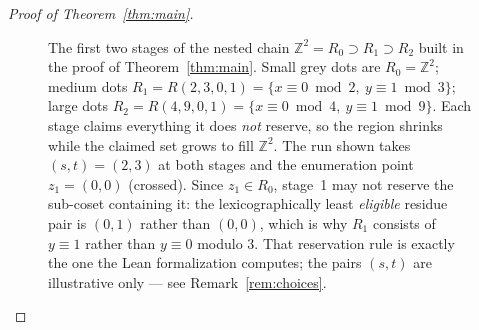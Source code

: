 \documentclass[a4paper,11pt,oneside,reqno]{amsart}
\theoremstyle{definition}
\theoremstyle{remark}
\theoremstyle{plain}
\newcommand{\Z}{\mathbb{Z}}
\begin{document}
\begin{proof}[Proof of Theorem~\ref{thm:main}]
\begin{figure}[htbp]
  \centering
  \caption{The first two stages of the nested chain \(\Z^2=R_0\supset R_1\supset R_2\) built in the
    proof of Theorem~\ref{thm:main}. Small grey dots are \(R_0=\Z^2\); medium dots
    \(R_1=R(2,3,0,1)=\{x\equiv0\bmod2,\ y\equiv1\bmod3\}\); large dots
    \(R_2=R(4,9,0,1)=\{x\equiv0\bmod4,\ y\equiv1\bmod9\}\). Each stage claims everything it does
    \emph{not} reserve, so the region shrinks while the claimed set grows to fill \(\Z^2\).
    The run shown takes \((s,t)=(2,3)\) at both stages and the enumeration point \(z_1=(0,0)\)
    (crossed). Since \(z_1\in R_0\), stage~1 may not reserve the sub-coset containing it: the
    lexicographically least \emph{eligible} residue pair is \((0,1)\) rather than \((0,0)\), which
    is why \(R_1\) consists of \(y\equiv1\) rather than \(y\equiv0\) modulo \(3\). That reservation
    rule is exactly the one the Lean formalization computes; the pairs \((s,t)\) are illustrative
    only --- see Remark~\ref{rem:choices}.}
  \label{fig:nesting}
\end{figure}


\end{proof}
\end{document}
